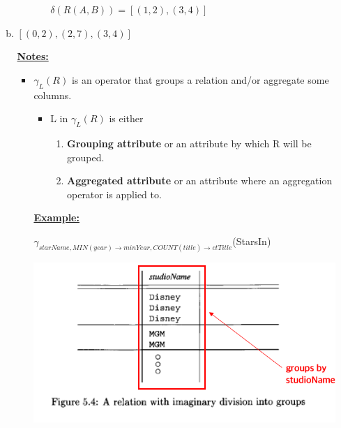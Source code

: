 \documentclass[12pt]{article}
\begin{document}
\begin{enumerate}[1.]
\begin{enumerate}[a)]
\begin{itemize}
\begin{itemize}
                \bigskip

                $\delta(R(A,B)) = [(1,2),(3,4)]$
            \end{itemize}
        \end{itemize}

        \item

        $[(0,2),(2,7),(3,4)]$

        \bigskip

        \underline{\textbf{Notes:}}

        \bigskip

        \begin{itemize}
            \item $\gamma_L(R)$ is an operator that groups a relation and/or aggregate
            some columns.

            \begin{itemize}
                \item L in $\gamma_L(R)$ is either
                \begin{enumerate}[1.]
                    \item \textbf{Grouping attribute} or an attribute by which R will be grouped.
                    \item \textbf{Aggregated attribute} or an attribute where an aggregation operator
                    is applied to.
                \end{enumerate}
            \end{itemize}

            \bigskip

            \underline{\textbf{Example:}}

            \bigskip

            $\gamma_{starName, MIN(year) \to minYear, COUNT(title) \to ctTitle}$(StarsIn)

            \bigskip

            \begin{center}
            \includegraphics[width=0.7\linewidth]{images/worksheet_4_solution_1.png}
            \end{center}


\end{itemize}
\end{enumerate}
\end{enumerate}
\end{document}
